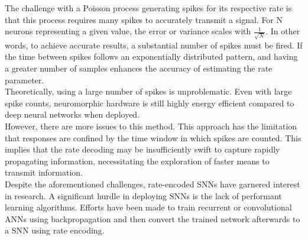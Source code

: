 The challenge with a Poisson process generating spikes for its respective rate is that this process requires many spikes to accurately transmit a signal. For N neurons representing a given value, the error or variance scales with $\frac{1}{\sqrt{N}}$\cite{boerlin_predictive_2013}. In other words, to achieve accurate results, a substantial number of spikes must be fired. If the time between spikes follows an exponentially distributed pattern, and having a greater number of samples enhances the accuracy of estimating the rate parameter.\\
Theoretically, using a large number of spikes is unproblematic. Even with large spike counts, neuromorphic hardware is still highly energy efficient compared to deep neural networks when deployed\cite{indiveri_importance_2019}.\\
However, there are more issues to this method. This approach has the limitation that responses are confined by the time window in which spikes are counted\cite{andrew_spiking_2003}. This implies that the rate decoding may be insufficiently swift to capture rapidly propagating information\cite{guo_neural_2021}, necessitating the exploration of faster means to transmit information.\\
Despite the aforementioned challenges, rate-encoded \acp{SNN} have garnered interest in research. A significant hurdle in deploying \acp{SNN} is the lack of performant learning algorithms. Efforts have been made to train recurrent or convolutional \acp{ANN} using backpropagation and then convert the trained network afterwards to a \ac{SNN}\cite{pfeiffer_deep_2018} using rate encoding\cite{diehl_conversion_2016}\cite{diehl_fast-classifying_2015}.

